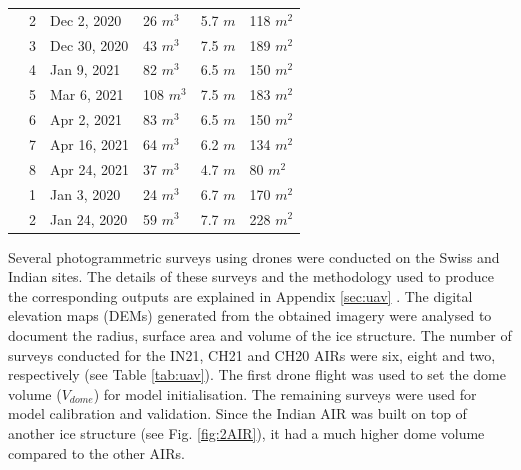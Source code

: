 \documentclass[utf8]{frontiersSCNS}
\begin{document}
\begin{table}
\begin{tabular}{@{}|llllll|@{}}
		\multicolumn{1}{|l|}{} & 2            & Dec 2, 2020   & 26 $m^{3}$      & 5.7 $m$
		                       & 118 $m^{2}$                                                                       \\
		\multicolumn{1}{|l|}{} & 3            & Dec 30, 2020  & 43 $m^{3}$      & 7.5 $m$
		                       & 189 $m^{2}$                                                                       \\
		\multicolumn{1}{|l|}{} & 4            & Jan 9, 2021   & 82 $m^{3}$      & 6.5 $m$
		                       & 150 $m^{2}$                                                                       \\
		\multicolumn{1}{|l|}{} & 5            & Mar 6, 2021   & 108 $m^{3}$     & 7.5 $m$
		                       & 183 $m^{2}$                                                                       \\
		\multicolumn{1}{|l|}{} & 6            & Apr 2, 2021   & 83 $m^{3}$      & 6.5 $m$
		                       & 150 $m^{2}$                                                                       \\
		\multicolumn{1}{|l|}{} & 7            & Apr 16, 2021  & 64 $m^{3}$      & 6.2 $m$
		                       & 134 $m^{2}$                                                                       \\
		\multicolumn{1}{|l|}{} & 8            & Apr 24, 2021  & 37 $m^{3}$      & 4.7 $m$
		                       & 80 $m^{2}$                                                                       \\
		\midrule
		\multicolumn{1}{|l|}{\multirow{2}{*}{\rotatebox[origin=c]{90}{CH20}}}
		                       & 1            & Jan 3, 2020   & 24 $m^{3}$      & 6.7 $m$
		                       & 170 $m^{2}$                                                                      \\
		\multicolumn{1}{|l|}{} & 2            & Jan 24, 2020  & 59 $m^{3}$      & 7.7 $m$
		                       & 228 $m^{2}$                                                                      \\
		\midrule
	\end{tabular}

\end{table}

Several photogrammetric surveys using drones were conducted on the Swiss and Indian sites. The details of these
surveys and the methodology used to produce the corresponding outputs are explained in Appendix \ref{sec:uav} .
The digital elevation maps (DEMs) generated from the obtained imagery were analysed to document the radius,
surface area and volume of the ice structure. The number of surveys conducted for the IN21, CH21 and CH20 AIRs
were six, eight and two, respectively (see Table \ref{tab:uav}). The first drone flight was used to set the dome volume
($V_{dome}$) for model initialisation. The remaining surveys were used for model calibration and validation.
Since the Indian AIR was built on top of another ice structure (see Fig. \ref{fig:2AIR}), it had a much higher
dome volume compared to the other AIRs.  
\end{document}
